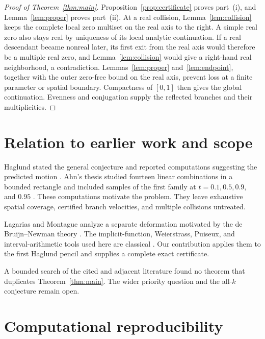 \documentclass[11pt,a4paper]{amsart}
\theoremstyle{definition}
\theoremstyle{remark}
\begin{document}
\begin{proof}[Proof of Theorem~\ref{thm:main}]
Proposition~\ref{prop:certificate} proves part~(i), and
Lemma~\ref{lem:proper} proves part~(ii).  At a real collision,
Lemma~\ref{lem:collision} keeps the complete local zero multiset on the real
axis to the right.  A simple real zero also stays real by uniqueness of its
local analytic continuation.  If a real descendant became nonreal later,
its first exit from the real axis would therefore be a multiple real zero,
and Lemma~\ref{lem:collision} would give a right-hand real neighborhood, a
contradiction.  Lemmas~\ref{lem:proper} and~\ref{lem:endpoint}, together with
the outer zero-free bound on the real axis, prevent loss at a finite parameter
or spatial boundary.  Compactness of $[0,1]$ then gives the global
continuation.  Evenness and conjugation supply the reflected branches and
their multiplicities.
\end{proof}

\section{Relation to earlier work and scope}

Haglund stated the general conjecture and reported computations suggesting
the predicted motion \cite{Haglund2011}.  Ahn's thesis studied fourteen
linear combinations in a bounded rectangle and included samples of the first
family at $t=0.1,0.5,0.9,$ and $0.95$
\cite[pp.~29--33, 78--80]{Ahn2012}.  These computations motivate the problem.
They leave exhaustive spatial coverage, certified branch velocities, and
multiple collisions untreated.

Lagarias and Montague analyze a separate deformation motivated by the de
Bruijn--Newman theory \cite{LagariasMontague2011}.  The implicit-function,
Weierstrass, Puiseux, and interval-arithmetic tools used here are classical
\cite{Chirka1989,Wall2004,MooreKearfottCloud2009}.  Our contribution applies
them to the first Haglund pencil and supplies a complete exact certificate.

A bounded search of the cited and adjacent literature found no theorem that
duplicates Theorem~\ref{thm:main}.  The wider priority question and the all-$k$
conjecture remain open.

\section*{Computational reproducibility}
\end{document}
